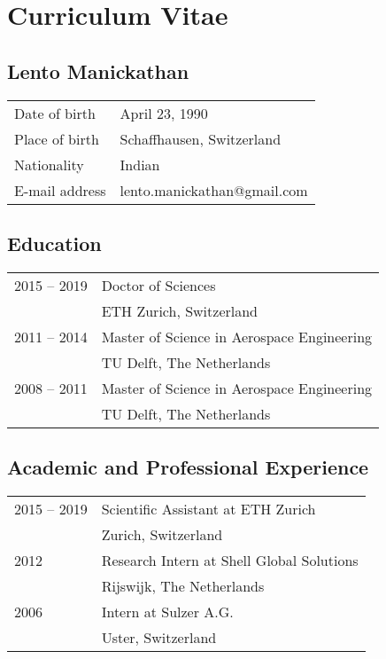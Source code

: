 \chapter{Curriculum Vitae}

\section*{Lento Manickathan}

\begin{tabular}{ll}
Date of birth	&  April 23, 1990\\ 
Place of birth	&  Schaffhausen, Switzerland\\ 
Nationality	& Indian \\ 
E-mail address	& lento.manickathan@gmail.com \\ 
\end{tabular} 

\vfill

\section*{Education}
\begin{tabular}{l p{10cm}}
2015 -- 2019  & Doctor of Sciences \\ 
~	&  ETH Zurich, Switzerland \\
2011 -- 2014  &  Master of Science in Aerospace Engineering\\ 
~	&  TU Delft, The Netherlands\\
2008 -- 2011  &  Master of Science in Aerospace Engineering\\
~	&  TU Delft, The Netherlands \\
\end{tabular} 

\section*{Academic and Professional Experience}
\begin{tabular}{l p{10cm}}
	2015 -- 2019  & Scientific Assistant at ETH Zurich \\ 
	~	&  Zurich, Switzerland \\
	2012 &  Research Intern at Shell Global Solutions \\ 
	~	&  Rijswijk, The Netherlands\\
	2006 & Intern at Sulzer A.G. \\
	~ 	& Uster, Switzerland
\end{tabular} 

